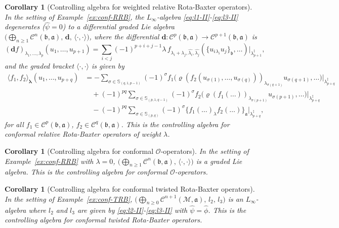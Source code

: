 \documentclass[a4paper,11pt]{article}
\def\Vs{\mathfrak{a}}
\def\Ws{\mathfrak{b}}
\def\Mod{\mathcal{M}}
\def\rep{\varrho}
\def\shf{\widehat{\psi}}
\def\Cch{\mathscr{C}}
\def\la{\lambda}
\def\perm{\mathbb{S}}
\newcommand{\dM}{\mathbf{d}}
\numberwithin{equation}{section}
\newtheorem{corollary}[theorem]{Corollary}
\begin{document}
\begin{corollary}[Controlling algebra for weighted relative Rota-Baxter operators]
\label{cor:control-RRB}
In the setting of Example~\ref{ex:conf-RRB}, the $L_\infty$-algebra
\eqref{eq:l1-II}-\eqref{eq:l3-II} degenerates ($\shf=0$) to a
differential graded Lie algebra
$\bigl(\bigoplus_{n\geq1}\Cch^n(\Ws,\Vs),\,\dM,\,\langle\cdot,\cdot\rangle\bigr)$,
where the differential $\dM:\Cch^p(\Ws,\Vs)\to\Cch^{p+1}(\Ws,\Vs)$ is
\begin{equation}\label{eq:diff-RRB}
  (\dM f)_{\la_1,\ldots,\la_p}(u_1,\ldots,u_{p+1})
  = \sum_{i<j}(-1)^{p+i+j-1}\la\,
    f_{\la_i+\la_j,\widehat{\la_i},\widehat{\la_j}}
    (\{u_i{}_{\la_i}u_j\}_\Ws,\ldots)
    \big|_{\la_{p+1}^\ddag},
\end{equation}
and the graded bracket $\langle\cdot,\cdot\rangle$ is given by
\begin{equation}\label{eq:bracket-RRB}
\begin{split}
  \langle f_1,f_2\rangle_{\boldsymbol\la}(u_1,\ldots,u_{p+q})
  &= -\!\!\sum_{\sigma\in\perm_{(q,1,p-1)}}(-1)^\sigma
     f_1\!\bigl(\rep(f_2(u_{\sigma(1)},\ldots,u_{\sigma(q)}))_{\la_{\sigma(q+1)}}
     u_{\sigma(q+1)},\ldots\bigr)\big|_{\la_{p+q}^\ddag}\\
  &\quad + (-1)^{pq}\!\!\sum_{\sigma\in\perm_{(p,1,q-1)}}(-1)^\sigma
     f_2\!\bigl(\rep(f_1(\ldots))_{\la_{\sigma(p+1)}}
     u_{\sigma(p+1)},\ldots\bigr)\big|_{\la_{p+q}^\ddag}\\
  &\quad - (-1)^{pq}\!\!\sum_{\sigma\in\perm_{(p,q)}}(-1)^\sigma
     \{f_1(\ldots)_\la f_2(\ldots)\}_\Vs\big|_{\la_{p+q}^\ddag},
\end{split}
\end{equation}
for all $f_1\in\Cch^p(\Ws,\Vs)$, $f_2\in\Cch^q(\Ws,\Vs)$.
This is the \textit{controlling algebra for conformal relative
Rota-Baxter operators of weight $\la$}.
\end{corollary}
 
\begin{corollary}[Controlling algebra for conformal $\mathcal{O}$-operators]
In the setting of Example~\ref{ex:conf-RRB} with $\la=0$,
$\bigl(\bigoplus_{n\geq1}\Cch^n(\Ws,\Vs),\,\langle\cdot,\cdot\rangle\bigr)$
is a graded Lie algebra.  This is the \textit{controlling algebra for
conformal $\mathcal{O}$-operators}.
\end{corollary}
 
\begin{corollary}[Controlling algebra for conformal twisted Rota-Baxter operators]
\label{cor:control-TRB}
In the setting of Example~\ref{ex:conf-TRB},
$\bigl(\bigoplus_{n\geq0}\Cch^{n+1}(\Mod,\Vs),\,l_2,\,l_3\bigr)$
is an $L_\infty$-algebra where $l_2$ and $l_3$ are given by
\eqref{eq:l2-II}-\eqref{eq:l3-II} with $\shf=\widehat\phi$.
This is the \textit{controlling algebra for conformal twisted
Rota-Baxter operators}.
\end{corollary}
 
\end{document}
